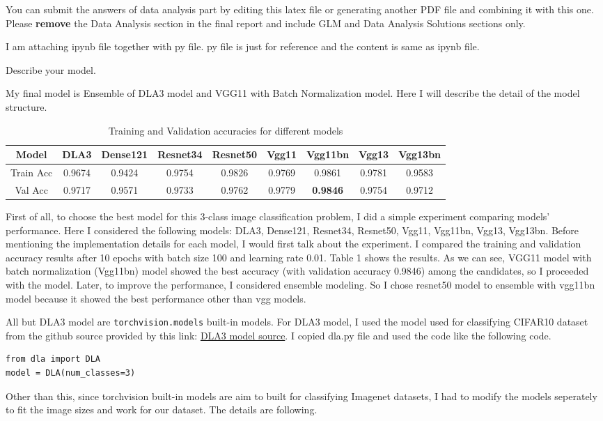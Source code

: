 \documentclass[11pt]{article}
\newcommand{\0}{{\mathbf{0}}}
\newcommand{\1}{{\mathbf{1}}}
\newcommand{\pr}[1]{\noindent{\bf #1.}}
\begin{document}
You can submit the answers of data analysis part by editing this latex file or generating another PDF file and combining it with this one. Please {\bf remove} the Data Analysis section in the final report and include GLM and Data Analysis Solutions sections only. 

I am attaching ipynb file together with py file. py file is just for reference and the content is same as ipynb file.

\pr{1} Describe your model. 

My final model is Ensemble of DLA3 model and VGG11 with Batch Normalization model. Here I will describe the detail of the model structure.

\begin{table}[h]
\begin{tabular}[\textwidth]{ | c | c | c | c | c | c  | c | c | c | }
\hline
Model & DLA3 & Dense121 & Resnet34 & Resnet50 & Vgg11 &  Vgg11bn & Vgg13 &  Vgg13bn \\
\hline
Train Acc &  0.9674 & 0.9424  & 0.9754  & 0.9826   & 0.9769 & 0.9861  & 0.9781 & 0.9583 \\
Val Acc & 0.9717 & 0.9571  & 0.9733 & 0.9762 & 0.9779  & \textbf{0.9846}  & 0.9754  & 0.9712 \\
\hline
\end{tabular}
\label{tab:models}
\caption{Training and Validation accuracies for different models}
\end{table}


First of all, to choose the best model for this 3-class image classification problem, I did a simple experiment comparing models' performance. Here I considered the following models:  DLA3, Dense121, Resnet34, Resnet50, Vgg11,  Vgg11bn, Vgg13,  Vgg13bn.
Before mentioning the implementation details for each model, I would first talk about the experiment. I compared the training and validation accuracy results after 10 epochs with batch size 100 and learning rate 0.01. Table 1 shows the results. As we can see, VGG11 model with batch normalization (Vgg11bn) model showed the best accuracy (with validation accuracy 0.9846) among the candidates, so I proceeded with the model. 
Later, to improve the performance, I considered ensemble modeling. So I chose resnet50 model to ensemble with vgg11bn model because it showed the best performance other than vgg models.

All but DLA3 model are \texttt{torchvision.models} built-in models. For DLA3 model, I used the model used for classifying CIFAR10 dataset from the github source provided by this link: \href{https://github.com/kuangliu/pytorch-cifar}{\color{blue}DLA3 model source}. I copied dla.py file and used the code like the following code. 
\begin{verbatim}
from dla import DLA
model = DLA(num_classes=3)
\end{verbatim}
 Other than this, since torchvision built-in models are aim to built for classifying Imagenet datasets, I had to modify the models seperately to fit the image sizes and work for our dataset. The details are following.
\end{document}
